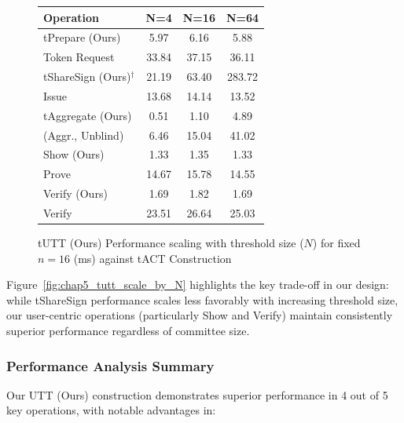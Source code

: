\begin{figure}[!htb]
\begin{minipage}[t]{0.48\textwidth}
        \vspace{0.5em}
        \scriptsize
        \begin{tabular}{lccc}
        \toprule
        \textbf{Operation} & \textbf{N=4} & \textbf{N=16} & \textbf{N=64} \\
        \midrule
        tPrepare (Ours) & 5.97 & 6.16 & 5.88 \\
        Token Request & 33.84 & 37.15 & 36.11 \\
        \midrule
        tShareSign (Ours)$^{\dagger}$ & 21.19 & 63.40 & 283.72 \\
        Issue & 13.68 & 14.14 & 13.52 \\
        \midrule
        tAggregate (Ours) & 0.51 & 1.10 & 4.89 \\
        (Aggr., Unblind) & 6.46 & 15.04 & 41.02 \\
        \midrule
        Show (Ours) & 1.33 & 1.35 & 1.33 \\
        Prove & 14.67 & 15.78 & 14.55 \\
        \midrule
        Verify (Ours) & 1.69 & 1.82 & 1.69 \\
        Verify & 23.51 & 26.64 & 25.03 \\
        \bottomrule
        \end{tabular}
        \caption{tUTT (Ours)  Performance scaling with threshold size ($N$) for fixed $n=16$ (ms) against tACT Construction}
        \label{tab:N_scaling_combined_utt_act}
    \end{minipage}
    
    \vspace{-0.5em}
    \scriptsize
\end{figure}


Figure~\ref{fig:chap5_tutt_scale_by_N} highlights the key trade-off in our design: while tShareSign performance scales less favorably with increasing threshold size, our user-centric operations (particularly Show and Verify) maintain consistently superior performance regardless of committee size.


\subsubsection{Performance Analysis Summary}
Our UTT (Ours) construction demonstrates superior performance in 4 out of 5 key operations, with notable advantages in:

